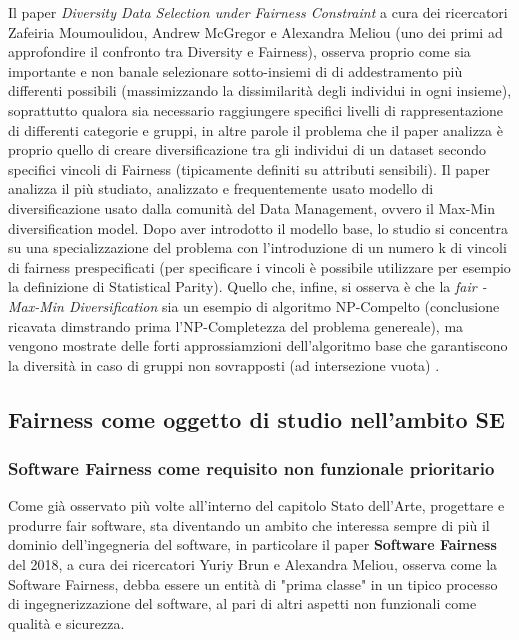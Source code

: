 Il paper \textit{Diversity Data Selection under Fairness Constraint} a cura dei ricercatori Zafeiria Moumoulidou, Andrew McGregor e Alexandra Meliou (uno dei primi ad approfondire il confronto tra Diversity e Fairness), osserva proprio come sia importante e non banale selezionare sotto-insiemi di di addestramento più differenti possibili (massimizzando la dissimilarità degli individui in ogni insieme), soprattutto qualora sia necessario raggiungere specifici livelli di rappresentazione di differenti categorie e gruppi, in altre parole il problema che il paper analizza è proprio quello di creare diversificazione tra gli individui di un dataset secondo specifici vincoli di Fairness (tipicamente definiti su attributi sensibili). Il paper analizza il più studiato, analizzato e frequentemente usato modello di diversificazione usato dalla comunità del Data Management, ovvero il Max-Min diversification model. Dopo aver introdotto il modello base, lo studio si concentra su una specializzazione del problema con l'introduzione di un numero k di vincoli di fairness prespecificati (per specificare i vincoli è possibile utilizzare per esempio la definizione di Statistical Parity). Quello che, infine, si osserva è che la \textit{fair - Max-Min Diversification} sia un esempio di algoritmo NP-Compelto (conclusione ricavata dimstrando prima l'NP-Completezza del problema genereale), ma vengono mostrate delle forti approssiamzioni dell'algoritmo base che garantiscono la diversità in caso di gruppi non sovrapposti (ad intersezione vuota) \cite{moumoulidou2020diverse}.

\subsection{Fairness come oggetto di studio nell'ambito SE}
\subsubsection{Software Fairness come requisito non funzionale prioritario}
Come già osservato più volte all'interno del capitolo Stato dell'Arte, progettare e produrre fair software, sta diventando un ambito che interessa sempre di più il dominio dell'ingegneria del software, in particolare il paper \textbf{Software Fairness} del 2018, a cura dei ricercatori Yuriy Brun e Alexandra Meliou, \cite{brun2018software} osserva come la Software Fairness, debba essere un entità di "prima classe" in un tipico processo di ingegnerizzazione del software, al pari di altri aspetti non funzionali come qualità e sicurezza.\\

